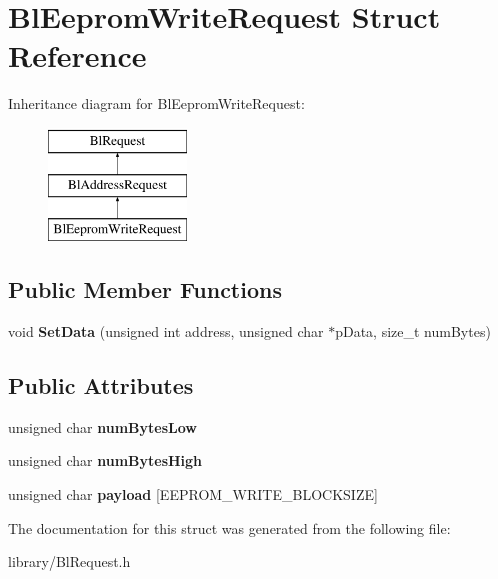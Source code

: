 \hypertarget{struct_bl_eeprom_write_request}{\section{Bl\-Eeprom\-Write\-Request Struct Reference}
\label{struct_bl_eeprom_write_request}
}
Inheritance diagram for Bl\-Eeprom\-Write\-Request\-:\begin{figure}[H]
\begin{center}
\leavevmode
\includegraphics[height=3.000000cm]{struct_bl_eeprom_write_request}
\end{center}
\end{figure}
\subsection*{Public Member Functions}
\begin{DoxyCompactItemize}
\item 
\hypertarget{struct_bl_eeprom_write_request_afbd5e65c2c49791b2812d965fea7ca51}{void {\bfseries Set\-Data} (unsigned int address, unsigned char $\ast$p\-Data, size\-\_\-t num\-Bytes)}\label{struct_bl_eeprom_write_request_afbd5e65c2c49791b2812d965fea7ca51}

\end{DoxyCompactItemize}
\subsection*{Public Attributes}
\begin{DoxyCompactItemize}
\item 
\hypertarget{struct_bl_eeprom_write_request_a99a5d20f83d1fac437f3f54703d40e14}{unsigned char {\bfseries num\-Bytes\-Low}}\label{struct_bl_eeprom_write_request_a99a5d20f83d1fac437f3f54703d40e14}

\item 
\hypertarget{struct_bl_eeprom_write_request_ab048ccd01058cf6713bd40b7120f9584}{unsigned char {\bfseries num\-Bytes\-High}}\label{struct_bl_eeprom_write_request_ab048ccd01058cf6713bd40b7120f9584}

\item 
\hypertarget{struct_bl_eeprom_write_request_a55b1312edf28cfa81d1ca266c986ad72}{unsigned char {\bfseries payload} \mbox{[}E\-E\-P\-R\-O\-M\-\_\-\-W\-R\-I\-T\-E\-\_\-\-B\-L\-O\-C\-K\-S\-I\-Z\-E\mbox{]}}\label{struct_bl_eeprom_write_request_a55b1312edf28cfa81d1ca266c986ad72}

\end{DoxyCompactItemize}


The documentation for this struct was generated from the following file\-:\begin{DoxyCompactItemize}
\item 
library/Bl\-Request.\-h\end{DoxyCompactItemize}
